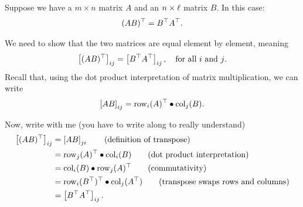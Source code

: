 \documentclass{ximera}
\begin{document}
\begin{proposition}
  Suppose we have a $m\times n$ matrix $A$ and an $n\times \ell$ matrix $B$. In this case:
  \[
    (AB)^\top = B^\top A^\top.
  \]
  \begin{explanation}
    We need to show that the two matrices are equal element by
    element, meaning
    \[
      \left[ (AB)^\top \right]_{ij} = \left[ B^\top
        A^\top \right]_{ij}, \quad\text{for all $i$ and $j$}.
    \]
    Recall that, using the dot product interpretation of matrix
    multiplication, we can write
    \[
      \left[ AB \right]_{ij} = \operatorname{row}_i(A)^\top \bullet \operatorname{col}_j(B).
    \]

    Now, write with me (you have to write along to really understand)
    \begin{align*}
      \left[ (AB)^\top \right]_{ij}
      & = \left[ AB \right]_{ji} \tag{definition of transpose} \\
      & = \operatorname{row}_j(A)^\top \bullet \operatorname{col}_i(B) \tag{dot product interpretation} \\
      & = \operatorname{col}_i(B) \bullet \operatorname{row}_j(A)^\top \tag{commutativity} \\
      & = \operatorname{row}_i(B^\top)^\top \bullet \operatorname{col}_j(A^\top)
        \tag{transpose swaps rows and columns} \\
      & = \left[ B^\top A^\top \right]_{ij}.
    \end{align*}
  \end{explanation}
\end{proposition}
\end{document}
